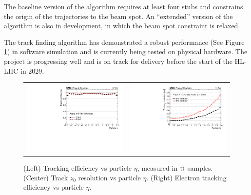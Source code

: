 The baseline version of the algorithm requires at least four stubs and constrains the origin of the trajectories to the beam spot. An ``extended'' version of the algorithm is also in development, in which the beam spot constraint is relaxed. 

The track finding algorithm has demonstrated a robust performance (See Figure \ref{fig:trackingperformance}) in software simulation and is currently being tested on physical hardware. The project is progressing well and is on track for delivery before the start of the \ac{HL-LHC} in 2029. 

 \begin{figure}[tbh!]
 \begin{center}
  \begin{tabular}{cc}
   \includegraphics[width=.45\linewidth]{figures/Part2/Upgrade/L1TK_ttbar-pu200_eff_eta}&
   \includegraphics[width=.45\linewidth]{figures/Part2/Upgrade/L1TK_ttbar-pu200_resVsEta_z0}
  \end{tabular}
  \caption{(Left) Tracking efficiency vs particle $\eta$, measured in $\textsf{t}\overline{\textsf{t}}$ samples. (Center) Track $z_0$ resolution vs particle $\eta$. (Right) Electron tracking efficiency vs particle $\eta$.}
 \label{fig:trackingperformance}
 \end{center}
\end{figure} 


